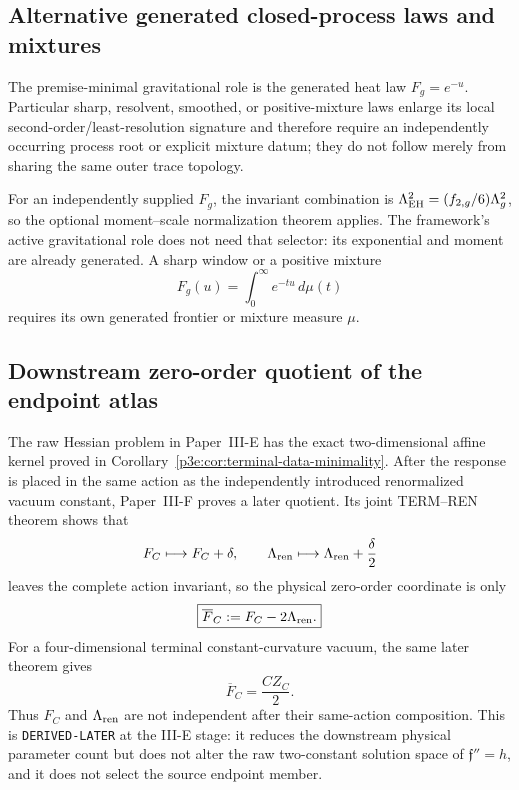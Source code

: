 \documentclass[11pt,a4paper]{article}
\begin{document}
\subsection{Alternative generated closed-process laws and mixtures}
\label{p3e:app:profile-representatives}
The premise-minimal gravitational role is the generated heat law
\(F_g=e^{-u}\).  Particular sharp, resolvent, smoothed, or positive-mixture
laws enlarge its local second-order/least-resolution signature and therefore
require an independently occurring process root or explicit mixture datum;
they do not follow merely from sharing the same outer trace topology.

\begin{remark}
\label{p3:rem:primitive-finite-window-profile}
For an independently supplied \(F_g\), the invariant combination is
\(\Lambda_{\rm EH}^2=(f_{2,g}/6)\Lambda_g^2\), so the optional
moment--scale normalization theorem applies.  The framework's active
gravitational role does not need that selector: its exponential and moment
are already generated.  A sharp window or a positive mixture
\[
 F_g(u)=\int_0^\infty e^{-tu}\,d\mu(t)
\]
requires its own generated frontier or mixture measure \(\mu\).
\end{remark}

\subsection{Downstream zero-order quotient of the endpoint atlas}
\label{p3e:app:term-ren-quotient}
The raw Hessian problem in Paper~III-E has the exact two-dimensional affine
kernel proved in Corollary~\ref{p3e:cor:terminal-data-minimality}.  After the
response is placed in the same action as the independently introduced
renormalized vacuum constant, Paper~III-F proves a later quotient.  Its
joint TERM--REN theorem shows that
\[
 F_C\longmapsto F_C+\delta,\qquad
 \Lambda_{\rm ren}\longmapsto\Lambda_{\rm ren}+\frac{\delta}{2}
\]
leaves the complete action invariant, so the physical zero-order coordinate
is only
\[
 \boxed{\overline F_C:=F_C-2\Lambda_{\rm ren}.}
\]
For a four-dimensional terminal constant-curvature vacuum, the same later
theorem gives
\[
 \boxed{\overline F_C=\frac{CZ_C}{2}.}
\]
Thus \(F_C\) and \(\Lambda_{\rm ren}\) are not independent after their
same-action composition.  This is \texttt{DERIVED-LATER} at the III-E stage:
it reduces the downstream physical parameter count but does not alter the raw
two-constant solution space of \(\mathfrak f''=h\), and it does not select the
source endpoint member.
\end{document}
